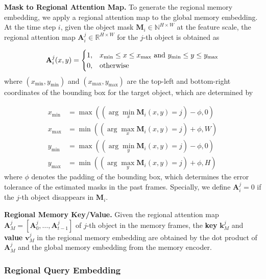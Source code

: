 \documentclass[final]{cvpr}
\begin{document}
\noindent \textbf{Mask to Regional Attention Map.}
To generate the regional memory embedding, we apply a regional attention map to the global memory embedding.
At the time step $i$, given the object mask $\mathbf{M}_i \in \mathbb{N}^{H \times W}$ at the feature scale, the regional attention map $\mathbf{A}_i^j \in \mathbb{R}^{H \times W}$ for the $j$-th object is obtained as

\vspace{-4 mm}
\begin{equation}
  \mathbf{A}_i^j(x, y) =
  \begin{cases}
    1, &x_{\min} \le x \le x_{\max}~{\rm and}~y_{\min} \le y \le y_{\max} \\
    0, &{\rm otherwise}
  \end{cases}
\end{equation}
where $(x_{\min}, y_{\min})$ and $(x_{\max}, y_{\max})$ are the top-left and bottom-right coordinates of the bounding box for the target object, which are determined by

\vspace{-4 mm}
\begin{align}
  x_{\min} &= \max((\arg\min_x \mathbf{M}_i(x, y) = j) - \phi, 0)  \nonumber \\
  x_{\max} &= \min((\arg\max_x \mathbf{M}_i(x, y) = j) + \phi, W)  \nonumber \\
  y_{\min} &= \max((\arg\min_y \mathbf{M}_i(x, y) = j) - \phi, 0)  \nonumber \\
  y_{\max} &= \min((\arg\max_y \mathbf{M}_i(x, y) = j) + \phi, H)
\end{align}
where 
$\phi$ denotes the padding of the bounding box, which determines the error tolerance of the estimated masks in the past frames.
Specially, we define $\mathbf{A}_i^j = 0$ if the $j$-th object disappears in $\mathbf{M}_i$.

\noindent \textbf{Regional Memory Key/Value.}
Given the regional attention map $\mathbf{A}_M^j = [\mathbf{A}_0^j, \dots, \mathbf{A}_{t-1}^j]$ of $j$-th object in the memory frames,
the \textbf{key} $\mathbf{k}_M^j$ and \textbf{value} $\mathbf{v}_M^j$ in the regional memory embedding are obtained by the dot product of $\mathbf{A}_M^j$ and the global memory embedding from the memory encoder.

\vspace{-3 mm}
\subsubsection{Regional Query Embedding}
\end{document}
